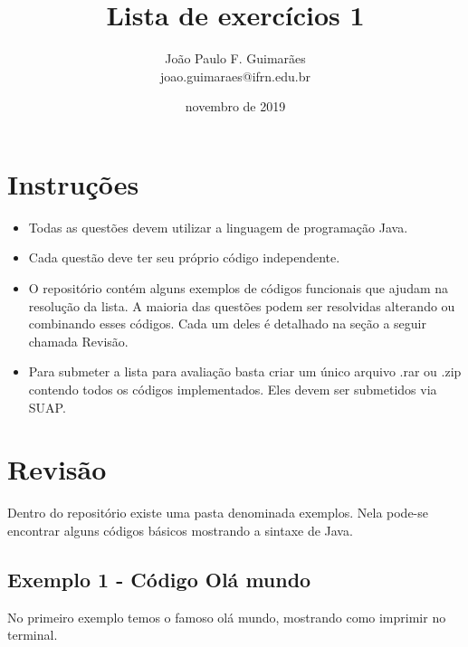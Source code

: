 \documentclass[12pt]{article}
\begin{document}
 

\title{Lista de exercícios 1} 
\author{João Paulo F. Guimarães \\ joao.guimaraes@ifrn.edu.br} 
\date{novembro de 2019} 

\maketitle %

\section{Instruções}

\begin{itemize}

  \item Todas as questões devem utilizar a linguagem de programação Java.

  \item Cada questão deve ter seu próprio código independente.

  \item O repositório contém alguns exemplos de códigos funcionais que ajudam na resolução da lista. A maioria das questões podem ser resolvidas alterando ou combinando esses códigos. Cada um deles é detalhado na seção a seguir chamada Revisão.

  \item Para submeter a lista para avaliação basta criar um único arquivo .rar ou .zip contendo todos os códigos implementados. Eles devem ser submetidos via SUAP.
  \end{itemize}


\section{Revisão}

Dentro do repositório existe uma pasta denominada exemplos. Nela pode-se encontrar alguns códigos básicos mostrando a sintaxe de Java.

\subsection{Exemplo 1 - Código Olá mundo}

No primeiro exemplo temos o famoso olá mundo, mostrando como imprimir no terminal.

\end{document}
